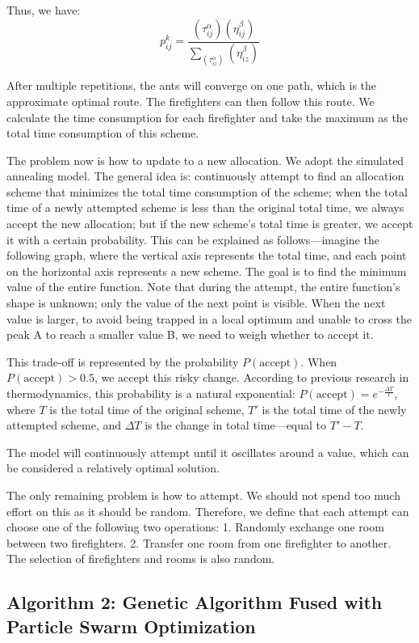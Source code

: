 Thus, we have:  
\[
p_{ij}^k  =\frac{(\tau_{ij}^\alpha)(\eta_{ij}^\beta)}{\sum_ (\tau_{iz}^\alpha)(\eta_{iz}^\beta)}
\]

After multiple repetitions, the ants will converge on one path, which is the approximate optimal route. The firefighters can then follow this route. We calculate the time consumption for each firefighter and take the maximum as the total time consumption of this scheme.  

The problem now is how to update to a new allocation. We adopt the simulated annealing model. The general idea is: continuously attempt to find an allocation scheme that minimizes the total time consumption of the scheme; when the total time of a newly attempted scheme is less than the original total time, we always accept the new allocation; but if the new scheme's total time is greater, we accept it with a certain probability. This can be explained as follows---imagine the following graph, where the vertical axis represents the total time, and each point on the horizontal axis represents a new scheme. The goal is to find the minimum value of the entire function. Note that during the attempt, the entire function's shape is unknown; only the value of the next point is visible. When the next value is larger, to avoid being trapped in a local optimum and unable to cross the peak A to reach a smaller value B, we need to weigh whether to accept it.  

This trade-off is represented by the probability $P(\text{accept})$. When $P(\text{accept}) > 0.5$, we accept this risky change. According to previous research in thermodynamics, this probability is a natural exponential:  \(P(\text{accept}) = e^{-\frac{\Delta T}{T}}\), where $T$ is the total time of the original scheme, $T'$ is the total time of the newly attempted scheme, and $\Delta T$ is the change in total time---equal to $T' - T$.  

The model will continuously attempt until it oscillates around a value, which can be considered a relatively optimal solution.  

The only remaining problem is how to attempt. We should not spend too much effort on this as it should be random. Therefore, we define that each attempt can choose one of the following two operations: 1. Randomly exchange one room between two firefighters. 2. Transfer one room from one firefighter to another. The selection of firefighters and rooms is also random.  

\subsection*{Algorithm 2: Genetic Algorithm Fused with Particle Swarm Optimization}

